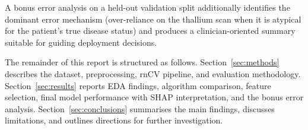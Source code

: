 A bonus error analysis on a held-out validation split additionally identifies the dominant error mechanism (over-reliance on the thallium scan when it is atypical for the patient's true disease status) and produces a clinician-oriented summary suitable for guiding deployment decisions.

The remainder of this report is structured as follows. Section~\ref{sec:methods} describes the dataset, preprocessing, rnCV pipeline, and evaluation methodology. Section~\ref{sec:results} reports EDA findings, algorithm comparison, feature selection, final model performance with SHAP interpretation, and the bonus error analysis. Section~\ref{sec:conclusions} summarises the main findings, discusses limitations, and outlines directions for further investigation.
